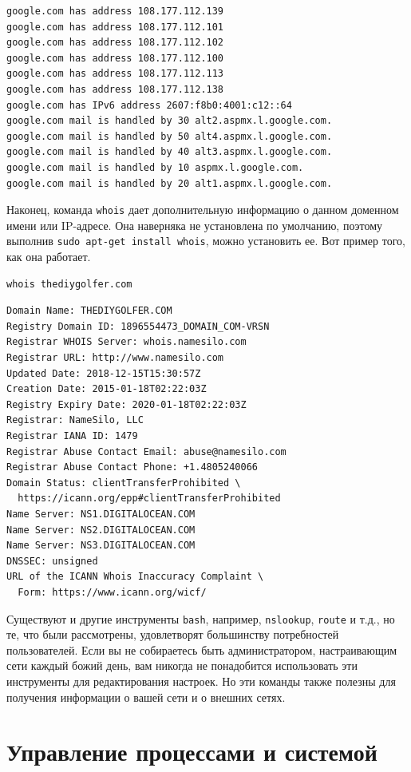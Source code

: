 \documentclass[a4paper,12pt,final,openany]{extbook}
\begin{document}
\begin{verbatim}
google.com has address 108.177.112.139
google.com has address 108.177.112.101
google.com has address 108.177.112.102
google.com has address 108.177.112.100
google.com has address 108.177.112.113
google.com has address 108.177.112.138
google.com has IPv6 address 2607:f8b0:4001:c12::64
google.com mail is handled by 30 alt2.aspmx.l.google.com.
google.com mail is handled by 50 alt4.aspmx.l.google.com.
google.com mail is handled by 40 alt3.aspmx.l.google.com.
google.com mail is handled by 10 aspmx.l.google.com.
google.com mail is handled by 20 alt1.aspmx.l.google.com.
\end{verbatim}

Наконец, команда \texttt{whois} дает дополнительную информацию о данном
доменном имени или IP-адресе. Она наверняка не установлена по умолчанию,
поэтому выполнив \texttt{sudo\ apt-get\ install\ whois}, можно
установить ее. Вот пример того, как она работает.
\begin{verbatim}
whois thediygolfer.com
\end{verbatim}

\begin{verbatim}
Domain Name: THEDIYGOLFER.COM
Registry Domain ID: 1896554473_DOMAIN_COM-VRSN
Registrar WHOIS Server: whois.namesilo.com
Registrar URL: http://www.namesilo.com
Updated Date: 2018-12-15T15:30:57Z
Creation Date: 2015-01-18T02:22:03Z
Registry Expiry Date: 2020-01-18T02:22:03Z
Registrar: NameSilo, LLC
Registrar IANA ID: 1479
Registrar Abuse Contact Email: abuse@namesilo.com
Registrar Abuse Contact Phone: +1.4805240066
Domain Status: clientTransferProhibited \
  https://icann.org/epp#clientTransferProhibited
Name Server: NS1.DIGITALOCEAN.COM
Name Server: NS2.DIGITALOCEAN.COM
Name Server: NS3.DIGITALOCEAN.COM
DNSSEC: unsigned
URL of the ICANN Whois Inaccuracy Complaint \
  Form: https://www.icann.org/wicf/
\end{verbatim}

Существуют и другие инструменты \texttt{bash}, например, \texttt{nslookup},
\texttt{route} и т.д., но те, что были рассмотрены, удовлетворят
большинству потребностей пользователей. Если вы не собираетесь быть
администратором, настраивающим сети каждый божий день, вам никогда не
понадобится использовать эти инструменты для редактирования настроек. Но
эти команды также полезны для получения информации о вашей сети и о внешних сетях.

\hypertarget{Process-Management-and-System-Management}{%
\section{\texorpdfstring{\protect\hyperlink{Process-Management-and-System-Management}{}Управление
процессами и
системой}{Управление процессами и системой}}\label{Process-Management-and-System-Management}}
\end{document}
